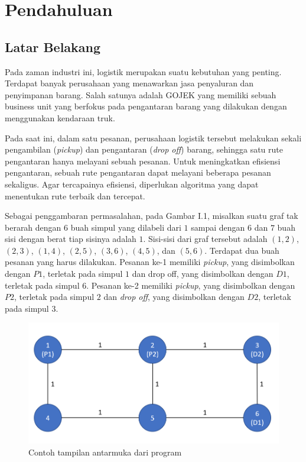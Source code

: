 \chapter{Pendahuluan}

\section{Latar Belakang}

Pada zaman industri ini, logistik merupakan suatu kebutuhan yang penting. Terdapat banyak 
perusahaan yang menawarkan jasa penyaluran dan penyimpanan barang. Salah satunya adalah 
GOJEK yang memiliki sebuah business unit yang berfokus pada pengantaran barang yang 
dilakukan dengan menggunakan kendaraan truk.

Pada saat ini, dalam satu pesanan, perusahaan logistik tersebut melakukan sekali pengambilan 
(\textit{pickup}) dan pengantaran (\textit{drop off}) barang, sehingga satu rute pengantaran 
hanya melayani sebuah pesanan. Untuk meningkatkan efisiensi pengantaran, sebuah rute 
pengantaran dapat melayani beberapa pesanan sekaligus. Agar tercapainya efisiensi, 
diperlukan algoritma yang dapat menentukan rute terbaik dan tercepat.

Sebagai penggambaran permasalahan, pada Gambar I.1, misalkan suatu graf tak berarah dengan 
$6$ buah simpul yang dilabeli dari $1$ sampai dengan $6$ dan $7$ buah sisi dengan berat 
tiap sisinya adalah $1$. Sisi-sisi dari graf tersebut adalah $(1,2)$, $(2,3)$, $(1,4)$, 
$(2,5)$, $(3,6)$, $(4,5)$, dan $(5,6)$. Terdapat dua buah pesanan yang harus dilakukan. 
Pesanan ke-1 memiliki \textit{pickup}, yang disimbolkan dengan $P1$, terletak pada simpul 
$1$ dan drop off, yang disimbolkan dengan $D1$, terletak pada simpul $6$. Pesanan ke-2 
memiliki \textit{pickup}, yang disimbolkan dengan $P2$, terletak pada simpul $2$ dan 
\textit{drop off}, yang disimbolkan dengan $D2$, terletak pada simpul $3$.

\begin{figure}[H]
  \centering
  \includegraphics[width=1.0\textwidth]{resources/graph_init.png}
  \caption{Contoh tampilan antarmuka dari program}
\end{figure}


